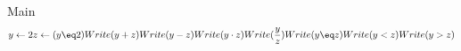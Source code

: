 Main
\[
  y \gets 2
  z \gets (y \eq 2)
  Write(y + z)
  Write(y - z)
  Write(y \cdot z)
  Write(\frac{y}{z})
  Write(y \eq z)
  Write(y < z)
  Write(y > z)
\]